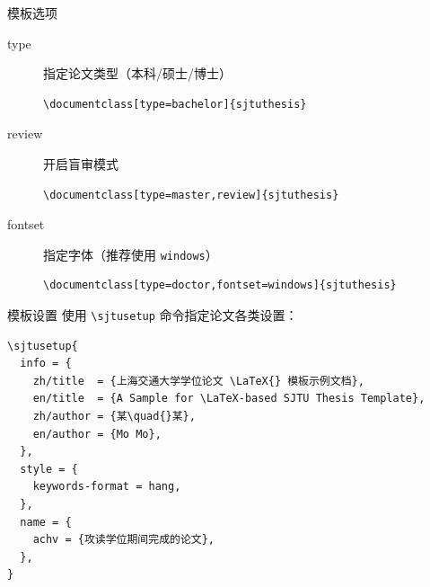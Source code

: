 \begin{frame}[fragile]{模板选项}
  \begin{description}
    \item[type] 指定论文类型（本科/硕士/博士）
          \begin{lstlisting}[basicstyle=\ttfamily]
\documentclass[type=bachelor]{sjtuthesis}
  \end{lstlisting}
    \item[review] 开启盲审模式
          \begin{lstlisting}[basicstyle=\ttfamily]
\documentclass[type=master,review]{sjtuthesis}
  \end{lstlisting}
    \item[fontset] 指定字体（推荐使用 \verb|windows|）
          \begin{lstlisting}[basicstyle=\ttfamily]
\documentclass[type=doctor,fontset=windows]{sjtuthesis}
  \end{lstlisting}
  \end{description}
\end{frame}

\begin{frame}[fragile]{模板设置}
  使用 \verb|\sjtusetup| 命令指定论文各类设置：
  \begin{lstlisting}
\sjtusetup{
  info = {
    zh/title  = {上海交通大学学位论文 \LaTeX{} 模板示例文档},
    en/title  = {A Sample for \LaTeX-based SJTU Thesis Template},
    zh/author = {某\quad{}某},
    en/author = {Mo Mo},
  },
  style = {
    keywords-format = hang,
  },
  name = {
    achv = {攻读学位期间完成的论文},
  },
}
  \end{lstlisting}
\end{frame}

